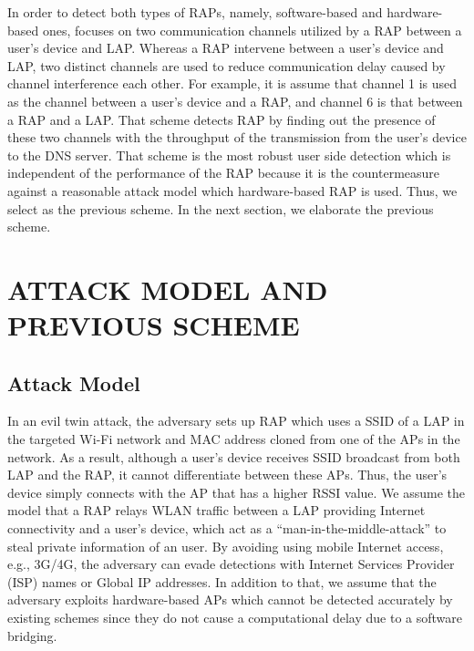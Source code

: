 \documentclass[conference]{IEEEtran}
\begin{document}
In order to detect both types of RAPs, namely, software-based and hardware-based ones, \cite{previous} focuses on two communication channels utilized by a RAP between a user's device and LAP.
Whereas a RAP intervene between a user's device and LAP, two distinct channels are used to reduce communication delay caused by channel interference each other.
For example, it is assume that channel 1 is used as the channel between a user's device and a RAP, and channel 6 is that between a RAP and a LAP.
That scheme detects RAP by finding out the presence of these two channels with the throughput of the transmission from the user's device to the DNS server.
That scheme is the most robust user side detection which is independent of the performance of the RAP because it is the countermeasure against a reasonable attack model which hardware-based RAP is used.
Thus, we select \cite{previous} as the previous scheme.
In the next section, we elaborate the previous scheme.



\section{ATTACK MODEL AND PREVIOUS SCHEME}
\subsection{Attack Model}
In an evil twin attack, the adversary sets up RAP which uses a SSID of a LAP in the targeted Wi-Fi network and MAC address cloned from one of the APs in the network.
As a result, although a user's device receives SSID broadcast from both LAP and the RAP, it cannot differentiate between these APs.
Thus, the user's device simply connects with the AP that has a higher RSSI value.
We assume the model that a RAP relays WLAN traffic between a LAP providing Internet connectivity and a user's device, which act as a ``man-in-the-middle-attack'' to steal private information of an user.
By avoiding using mobile Internet access, e.g., 3G/4G, the adversary can evade detections with Internet Services Provider (ISP) names or Global IP addresses\cite{rtt}.
In addition to that, we assume that the adversary exploits hardware-based APs which cannot be detected accurately by existing schemes since they do not cause a computational delay due to a software bridging.
\end{document}
